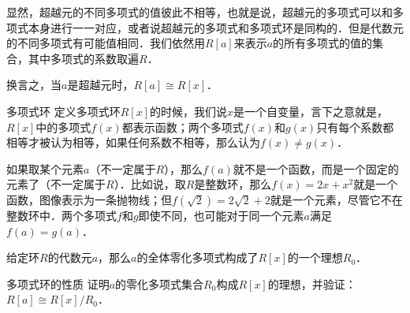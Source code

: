 显然，超越元的不同多项式的值彼此不相等，也就是说，超越元的多项式可以和多项式本身进行一一对应，或者说超越元的多项式和多项式环是同构的．但是代数元的不同多项式有可能值相同．我们依然用$R[a]$来表示$a$的所有多项式的值的集合，其中多项式的系数取遍$R$．

换言之，当$a$是超越元时，$R[a]\cong R[x]$．

\begin{example}{多项式环}
定义多项式环$R[x]$的时候，我们说$x$是一个自变量，言下之意就是，$R[x]$中的多项式$f(x)$都表示函数；两个多项式$f(x)$和$g(x)$只有每个系数都相等才被认为相等，如果任何系数不相等，那么认为$f(x)\not=g(x)$．

如果取某个元素$a$（不一定属于$R$），那么$f(a)$就不是一个函数，而是一个固定的元素了（不一定属于$R$）．比如说，取$R$是整数环，那么$f(x)=2x+x^2$就是一个函数，图像表示为一条抛物线；但$f(\sqrt{2})=2\sqrt{2}+2$就是一个元素，尽管它不在整数环中．两个多项式$f$和$g$即使不同，也可能对于同一个元素$a$满足$f(a)=g(a)$．

给定环$R$的代数元$a$，那么$a$的全体零化多项式构成了$R[x]$的一个理想$R_0$．


\end{example}

\begin{exercise}{多项式环的性质}
证明$a$的零化多项式集合$R_0$构成$R[x]$的理想，并验证：$R[a]\cong R[x]/R_0$．
\end{exercise}










